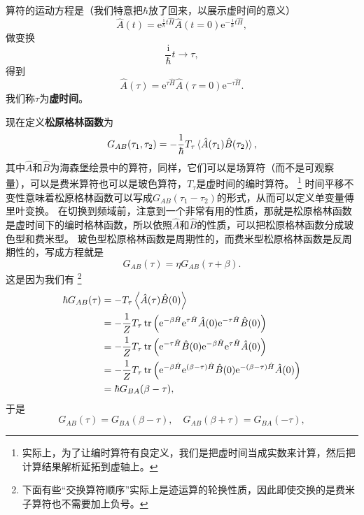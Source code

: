 \documentclass[hyperref, UTF8, a4paper]{ctexart}
\newcommand*{\ii}{\mathrm{i}}
\newcommand*{\ee}{\mathrm{e}}
\begin{document}
算符的运动方程是（我们特意把$\hbar$放了回来，以展示虚时间的意义）
\[
    \hat{A}(t) = \ee^{\frac{\ii}{\hbar} t \hat{H}} \hat{A}(t=0) \ee^{-\frac{\ii}{\hbar} t \hat{H}},
\]
做变换
\begin{equation}
    \frac{\ii}{\hbar} t \longrightarrow \tau,
\end{equation}
得到
\begin{equation}
    \hat{A}(\tau) = \ee^{\tau \hat{H}} \hat{A}(\tau=0) \ee^{-\tau \hat{H}}.
\end{equation}
我们称$\tau$为\textbf{虚时间}。

现在定义\textbf{松原格林函数}为
\begin{equation}
    G_{AB}(\tau_1, \tau_2) = - \frac{1}{\hbar} T_\tau \expval*{\hat{A}(\tau_1)\hat{B}(\tau_2)},
\end{equation}
其中$\hat{A}$和$\hat{B}$为海森堡绘景中的算符，同样，它们可以是场算符（而不是可观察量），可以是费米算符也可以是玻色算符，$T_\tau$是虚时间的编时算符。%
\footnote{实际上，为了让编时算符有良定义，我们是把虚时间当成实数来计算，然后把计算结果解析延拓到虚轴上。}%
时间平移不变性意味着松原格林函数可以写成$G_{AB}(\tau_1-\tau_2)$的形式，从而可以定义单变量傅里叶变换。
在切换到频域前，注意到一个非常有用的性质，那就是松原格林函数是虚时间下的编时格林函数，所以依照$\hat{A}$和$\hat{B}$的性质，可以把松原格林函数分成玻色型和费米型。
玻色型松原格林函数是周期性的，而费米型松原格林函数是反周期性的，写成方程就是
\begin{equation}
    G_{AB}(\tau) = \eta G_{AB}(\tau+\beta).
    \label{eq:period-matsubara}
\end{equation}
这是因为我们有%
\footnote{下面有些“交换算符顺序”实际上是迹运算的轮换性质，因此即使交换的是费米子算符也不需要加上负号。}%
\[
    \begin{aligned}
        \hbar G_{AB}(\tau) &= - T_\tau \expval{\hat{A}(\tau)\hat{B}(0)} \\
        &= - \frac{1}{Z} T_\tau \trace \left( \ee^{-\beta \hat{H}} \ee^{\tau \hat{H}} \hat{A}(0) \ee^{ - \tau \hat{H}} \hat{B}(0) \right) \\
        &= - \frac{1}{Z} T_\tau \trace \left(  \ee^{ - \tau \hat{H}} \hat{B}(0) \ee^{-\beta \hat{H}} \ee^{\tau \hat{H}} \hat{A}(0) \right) \\
        &= - \frac{1}{Z} T_\tau \trace \left( \ee^{-\beta \hat{H}} \ee^{(\beta-\tau) \hat{H}} \hat{B}(0) \ee^{-(\beta-\tau)\hat{H}} \hat{A}(0) \right) \\
        &= \hbar G_{BA} (\beta - \tau),
    \end{aligned}
\]
于是
\begin{equation}
    G_{AB}(\tau) = G_{BA} (\beta - \tau), \quad G_{AB}(\beta+\tau) = G_{BA}(-\tau),
\end{equation}
\end{document}
